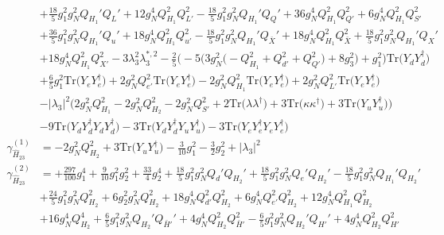 {\begin{align}
 &+\frac{18}{5} g_{1}^{2} g_{N}^{2} Q_{H_1}' Q_L' +12 g_{N}^{4} Q_{H_1}^{2} Q_{L'}^{2} -\frac{18}{5} g_{1}^{2} g_{N}^{2} Q_{H_1}' Q_Q' +36 g_{N}^{4} Q_{H_1}^{2} Q_{Q'}^{2} +6 g_{N}^{4} Q_{H_1}^{2} Q_{S'}^{2} \nonumber \\ 
 &+\frac{36}{5} g_{1}^{2} g_{N}^{2} Q_{H_1}' Q_u' +18 g_{N}^{4} Q_{H_1}^{2} Q_{u'}^{2} -\frac{18}{5} g_{1}^{2} g_{N}^{2} Q_{H_1}' Q_{\bar{X}}' +18 g_{N}^{4} Q_{H_1}^{2} Q_{\bar{X}}^{2} +\frac{18}{5} g_{1}^{2} g_{N}^{2} Q_{H_1}' Q_X' \nonumber \\ 
 &+18 g_{N}^{4} Q_{H_1}^{2} Q_{X'}^{2} -3 \lambda_{3}^{2} \lambda_{3}^{*,2} -\frac{2}{5} \Big(-5 \Big(3 g_{N}^{2} \Big(- Q_{H_1}^{2}  + Q_{d'}^{2} + Q_{Q'}^{2}\Big) + 8 g_{3}^{2} \Big) + g_{1}^{2}\Big)\mbox{Tr}\Big({Y_d  Y_{d}^{\dagger}}\Big) \nonumber \\ 
 &+\frac{6}{5} g_{1}^{2} \mbox{Tr}\Big({Y_e  Y_{e}^{\dagger}}\Big) +2 g_{N}^{2} Q_{e'}^{2} \mbox{Tr}\Big({Y_e  Y_{e}^{\dagger}}\Big) -2 g_{N}^{2} Q_{H_1}^{2} \mbox{Tr}\Big({Y_e  Y_{e}^{\dagger}}\Big) +2 g_{N}^{2} Q_{L'}^{2} \mbox{Tr}\Big({Y_e  Y_{e}^{\dagger}}\Big) \nonumber \\ 
 &- |\lambda_3|^2 \Big(2 g_{N}^{2} Q_{H_1}^{2}  -2 g_{N}^{2} Q_{H_2}^{2}  -2 g_{N}^{2} Q_{S'}^{2}  + 2 \mbox{Tr}\Big({\lambda  \lambda^{\dagger}}\Big)  + 3 \mbox{Tr}\Big({\kappa  \kappa^{\dagger}}\Big)  + 3 \mbox{Tr}\Big({Y_u  Y_{u}^{\dagger}}\Big) \Big)\nonumber \\ 
 &-9 \mbox{Tr}\Big({Y_d  Y_{d}^{\dagger}  Y_d  Y_{d}^{\dagger}}\Big) -3 \mbox{Tr}\Big({Y_d  Y_{d}^{\dagger}  Y_u  Y_{u}^{\dagger}}\Big) -3 \mbox{Tr}\Big({Y_e  Y_{e}^{\dagger}  Y_e  Y_{e}^{\dagger}}\Big) \\ 
\gamma_{\hat{H}_{23}}^{(1)} & =  
-2 g_{N}^{2} Q_{H_2}^{2}  + 3 \mbox{Tr}\Big({Y_u  Y_{u}^{\dagger}}\Big)  -\frac{3}{10} g_{1}^{2}  -\frac{3}{2} g_{2}^{2}  + |\lambda_3|^2\\ 
\gamma_{\hat{H}_{23}}^{(2)} & =  
+\frac{297}{100} g_{1}^{4} +\frac{9}{10} g_{1}^{2} g_{2}^{2} +\frac{33}{4} g_{2}^{4} +\frac{18}{5} g_{1}^{2} g_{N}^{2} Q_d' Q_{H_2}' +\frac{18}{5} g_{1}^{2} g_{N}^{2} Q_e' Q_{H_2}' -\frac{18}{5} g_{1}^{2} g_{N}^{2} Q_{H_1}' Q_{H_2}' \nonumber \\ 
 &+\frac{24}{5} g_{1}^{2} g_{N}^{2} Q_{H_2}^{2} +6 g_{2}^{2} g_{N}^{2} Q_{H_2}^{2} +18 g_{N}^{4} Q_{d'}^{2} Q_{H_2}^{2} +6 g_{N}^{4} Q_{e'}^{2} Q_{H_2}^{2} +12 g_{N}^{4} Q_{H_1}^{2} Q_{H_2}^{2} \nonumber \\ 
 &+16 g_{N}^{4} Q_{H_2}^{4} +\frac{6}{5} g_{1}^{2} g_{N}^{2} Q_{H_2}' Q_{\bar{H}'}' +4 g_{N}^{4} Q_{H_2}^{2} Q_{\bar{H}'}^{2} -\frac{6}{5} g_{1}^{2} g_{N}^{2} Q_{H_2}' Q_{H'}' +4 g_{N}^{4} Q_{H_2}^{2} Q_{H'}^{2} \nonumber \\ 

\end{align}}
